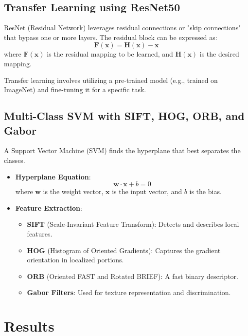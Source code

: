 \documentclass[a0,portrait]{a0poster}
\begin{document}
\begin{multicols}{2}
\subsection*{Transfer Learning using ResNet50}
ResNet (Residual Network) leverages residual connections or "skip connections" that bypass one or more layers. The residual block can be expressed as:
\[
\mathbf{F}(\mathbf{x}) = \mathbf{H}(\mathbf{x}) - \mathbf{x}
\]
where \( \mathbf{F}(\mathbf{x}) \) is the residual mapping to be learned, and \( \mathbf{H}(\mathbf{x}) \) is the desired mapping.

Transfer learning involves utilizing a pre-trained model (e.g., trained on ImageNet) and fine-tuning it for a specific task.

\subsection*{Multi-Class SVM with SIFT, HOG, ORB, and Gabor}
A Support Vector Machine (SVM) finds the hyperplane that best separates the classes.

\begin{itemize}
\item \textbf{Hyperplane Equation}:
  \[
  \mathbf{w} \cdot \mathbf{x} + b = 0
  \]
  where \( \mathbf{w} \) is the weight vector, \( \mathbf{x} \) is the input vector, and \( b \) is the bias.
\item \textbf{Feature Extraction}:
  \begin{itemize}
  \item \textbf{SIFT} (Scale-Invariant Feature Transform): Detects and describes local features.
  \item \textbf{HOG} (Histogram of Oriented Gradients): Captures the gradient orientation in localized portions.
  \item \textbf{ORB} (Oriented FAST and Rotated BRIEF): A fast binary descriptor.
  \item \textbf{Gabor Filters}: Used for texture representation and discrimination.
  \end{itemize}
\end{itemize}

\section*{Results}


\end{multicols}
\end{document}
